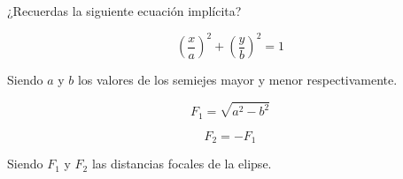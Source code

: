 \documentclass[preview]{standalone}
\begin{document}
\begin{center}
¿Recuerdas la siguiente ecuación implícita?

$$\left(\frac{x}{a}\right)^2+\left(\frac{y}{b}\right)^2=1$$ 

Siendo $a$ y $b$ los valores de los semiejes mayor y menor respectivamente. 

$$F_1=\sqrt{a^2-b^2}$$

$$F_2=-F_1$$

Siendo $F_1$ y $F_2$ las distancias focales de la elipse.
\end{center}
\end{document}
